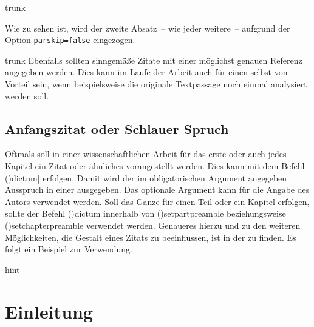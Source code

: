\documentclass[%
  english,ngerman,%
  cdgeometry=no,DIV=12,%
  cd=false,cdfont=false,cdtitle=true,%
  headings=normal,%
  automark,%
  listof=toc,%
]{tudscrartcl}
\begin{document}
\begin{refsection}
\begin{Code}[input]{trunk}
\begin{quoting}
{  Wie zu sehen ist, wird der zweite Absatz~-- wie jeder weitere~-- 
  aufgrund der Option \texttt{parskip=false} eingezogen.
}
\cite[sinngemäß nach][\pno{} 12, zweiter Absatz]{hanisch19}
\end{quoting}
\end{Code}
\begin{Code}[nolst]{trunk}
Ebenfalls sollten sinngemäße Zitate mit einer möglichst genauen Referenz 
angegeben werden. Dies kann im Laufe der Arbeit auch für einen selbst von 
Vorteil sein, wenn beispielsweise die originale Textpassage noch einmal 
analysiert werden soll.

\end{Code}
\begin{quoting}[rightmargin=0pt]
\makeatletter
\let\markboth\@gobbletwo
\let\markright\@gobble
\makeatother
\printbibliography
\end{quoting}
\end{refsection}



\section{Anfangszitat oder Schlauer Spruch}

\renewcommand*\dictumwidth{.4\textwidth}%
%

\bigskip\noindent
Oftmals soll in einer wissenschaftlichen Arbeit für das erste oder auch jedes 
Kapitel ein Zitat oder ähnliches vorangestellt werden. Dies kann mit dem Befehl
\Macro(){dictum|}
erfolgen. Damit wird der im obligatorischen Argument angegeben Ausspruch in 
einer  ausgegeben. Das optionale Argument kann für die Angabe 
des Autors verwendet werden. Soll das Ganze für einen Teil oder ein Kapitel 
erfolgen, sollte der Befehl \Macro(){dictum} innerhalb 
von \Macro(){setpartpreamble} beziehungsweise 
\Macro(){setchapterpreamble} verwendet werden. Genaueres 
hierzu und zu den weiteren Möglichkeiten, die Gestalt eines Zitats zu 
beeinflussen, ist in der  zu finden. Es 
folgt ein Beispiel zur Verwendung.
%
\begin{Code}{hint}
\chapter{Einleitung}

\end{Code}
\end{document}
